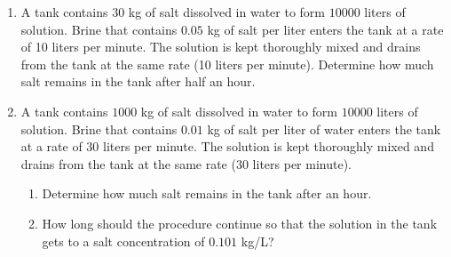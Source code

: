 \begin{enumerate}
\item \label{problemMixingProblem1}
A tank contains 30 kg of salt dissolved in water to form $10000$ liters of solution. Brine that contains $0.05$ kg of salt per liter enters the tank at a rate of 10 liters per minute. The solution is kept thoroughly mixed and drains from the tank at the same rate (10 liters per minute). Determine how much salt remains in the tank after half an hour.
\item \label{problemMixingProblem2} A tank contains $1000$ kg of salt dissolved in water to form $10000$ liters of solution. Brine that contains $0.01$ kg of salt per liter of water enters the tank at a rate of $30$ liters per minute. The solution is kept thoroughly mixed and drains from the tank at the same rate ($30$ liters per minute). 
\begin{enumerate} 
\item Determine how much salt remains in the tank after an hour. 
\item How long should the procedure continue  so that the solution in the tank gets to a salt concentration of $0.101$ kg/L? 
\end{enumerate}
\end{enumerate}


\solution{\ref{problemMixingProblem1}


}